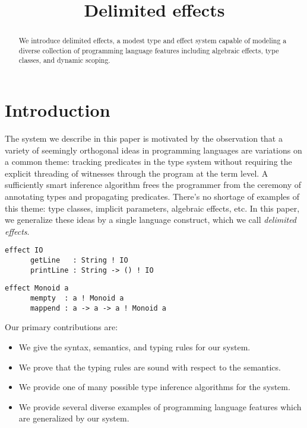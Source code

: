 \documentclass[12pt]{article}
\title{Delimited effects}
\date{}
\begin{document}
  \maketitle

  \begin{abstract}
    We introduce delimited effects, a modest type and effect system capable of modeling a diverse collection of programming language features including algebraic effects, type classes, and dynamic scoping.
  \end{abstract}

  \section{Introduction}

  The system we describe in this paper is motivated by the observation that a variety of seemingly orthogonal ideas in programming languages are variations on a common theme: tracking predicates in the type system without requiring the explicit threading of witnesses through the program at the term level. A sufficiently smart inference algorithm frees the programmer from the ceremony of annotating types and propagating predicates. There's no shortage of examples of this theme: type classes, implicit parameters, algebraic effects, etc. In this paper, we generalize these ideas by a single language construct, which we call \emph{delimited effects}.

  \begin{lstlisting}[gobble=4]
    effect IO
      getLine   : String ! IO
      printLine : String -> () ! IO
  \end{lstlisting}

  \begin{lstlisting}[gobble=4]
    effect Monoid a
      mempty  : a ! Monoid a
      mappend : a -> a -> a ! Monoid a
  \end{lstlisting}

  Our primary contributions are:

  \begin{itemize}
    \item We give the syntax, semantics, and typing rules for our system.
    \item We prove that the typing rules are sound with respect to the semantics.
    \item We provide one of many possible type inference algorithms for the system.
    \item We provide several diverse examples of programming language features which are generalized by our system.
  \end{itemize}
\end{document}
